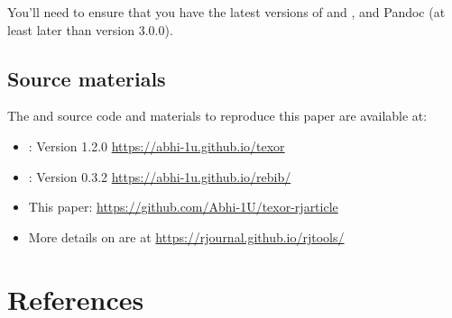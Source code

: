 You'll need to ensure that you have the latest versions of  and , and Pandoc (at least later than version 3.0.0).

\hypertarget{source-materials}{%
\subsection*{Source materials}\label{source-materials}}

The  and  source code and materials to reproduce this paper are available at:

\begin{itemize}
\tightlist
\item
  : Version 1.2.0 \url{https://abhi-1u.github.io/texor}
\item
  : Version 0.3.2 \url{https://abhi-1u.github.io/rebib/}
\item
  This paper: \url{https://github.com/Abhi-1U/texor-rjarticle}
\item
  More details on  are at \url{https://rjournal.github.io/rjtools/}
\end{itemize}

\hypertarget{references}{%
\section*{References}\label{references}}

